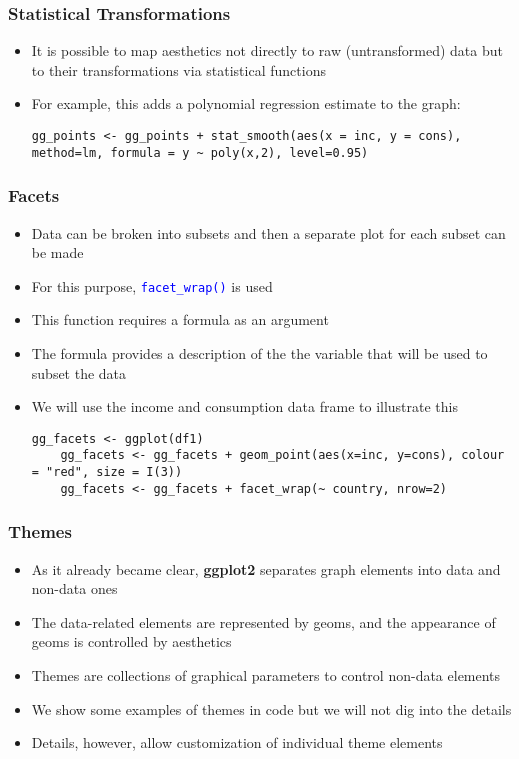 \documentclass[10pt]{beamer}
\newcommand{\cc}[1]{\texttt{\textcolor{blue}{#1}}}
\theoremstyle{definition}
\begin{document}
\begin{frame}[fragile]
\frametitle{Statistical Transformations}
\begin{itemize}
	\item It is possible to map aesthetics not directly to raw (untransformed) data but to their transformations via statistical functions
	\item For example, this adds a polynomial regression estimate to the graph:
	\begin{lstlisting}[style = rstyle, breaklines]
	gg_points <- gg_points + stat_smooth(aes(x = inc, y = cons), method=lm, formula = y ~ poly(x,2), level=0.95)
	\end{lstlisting}
\end{itemize}
\end{frame}

\begin{frame}[fragile]
\frametitle{Facets}
\begin{itemize}
	\item Data can be broken into subsets and then a separate plot for each subset can be made
	\item For this purpose, \cc{facet\_wrap()} is used 
	\item This function requires a formula as an argument 
	\item The formula provides a description of the the variable that will be used to
subset the data
	\item We will use the income and consumption data frame to illustrate this
	\begin{lstlisting}[style = rstyle, breaklines]
	gg_facets <- ggplot(df1)
	gg_facets <- gg_facets + geom_point(aes(x=inc, y=cons), colour = "red", size = I(3))
	gg_facets <- gg_facets + facet_wrap(~ country, nrow=2)
	\end{lstlisting}
\end{itemize}
\end{frame}

\begin{frame}[fragile]
\frametitle{Themes}
\begin{itemize}
	\item As it already became clear, \textbf{ggplot2} separates graph elements into data and non-data ones
	\item The data-related elements are represented by geoms, and the appearance of geoms is controlled by aesthetics
	\item Themes are collections of graphical parameters to control non-data elements
	\item We show some examples of themes in code but we will not dig into the details
	\item Details, however, allow customization of individual theme elements 
\end{itemize}
\end{frame}
\end{document}
